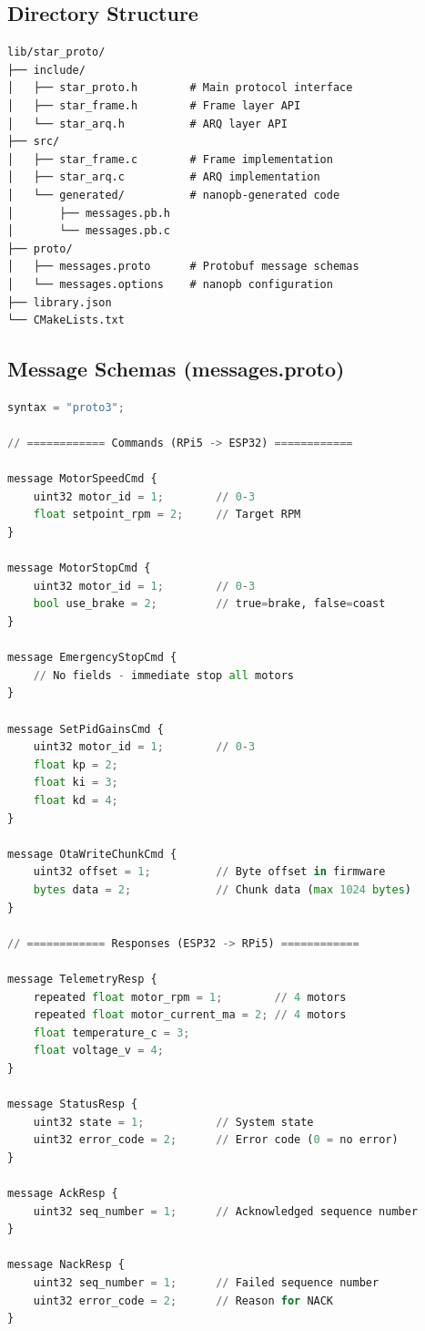 \documentclass[12pt,letterpaper]{article}
\begin{document}
\subsection{Directory Structure}

\begin{verbatim}
lib/star_proto/
├── include/
│   ├── star_proto.h        # Main protocol interface
│   ├── star_frame.h        # Frame layer API
│   └── star_arq.h          # ARQ layer API
├── src/
│   ├── star_frame.c        # Frame implementation
│   ├── star_arq.c          # ARQ implementation
│   └── generated/          # nanopb-generated code
│       ├── messages.pb.h
│       └── messages.pb.c
├── proto/
│   ├── messages.proto      # Protobuf message schemas
│   └── messages.options    # nanopb configuration
├── library.json
└── CMakeLists.txt
\end{verbatim}

\subsection{Message Schemas (messages.proto)}

\begin{lstlisting}[caption={messages.proto - Protocol Buffer Definitions},language=Python]
syntax = "proto3";

// ============ Commands (RPi5 -> ESP32) ============

message MotorSpeedCmd {
    uint32 motor_id = 1;        // 0-3
    float setpoint_rpm = 2;     // Target RPM
}

message MotorStopCmd {
    uint32 motor_id = 1;        // 0-3
    bool use_brake = 2;         // true=brake, false=coast
}

message EmergencyStopCmd {
    // No fields - immediate stop all motors
}

message SetPidGainsCmd {
    uint32 motor_id = 1;        // 0-3
    float kp = 2;
    float ki = 3;
    float kd = 4;
}

message OtaWriteChunkCmd {
    uint32 offset = 1;          // Byte offset in firmware
    bytes data = 2;             // Chunk data (max 1024 bytes)
}

// ============ Responses (ESP32 -> RPi5) ============

message TelemetryResp {
    repeated float motor_rpm = 1;        // 4 motors
    repeated float motor_current_ma = 2; // 4 motors
    float temperature_c = 3;
    float voltage_v = 4;
}

message StatusResp {
    uint32 state = 1;           // System state
    uint32 error_code = 2;      // Error code (0 = no error)
}

message AckResp {
    uint32 seq_number = 1;      // Acknowledged sequence number
}

message NackResp {
    uint32 seq_number = 1;      // Failed sequence number
    uint32 error_code = 2;      // Reason for NACK
}
\end{lstlisting}
\end{document}

